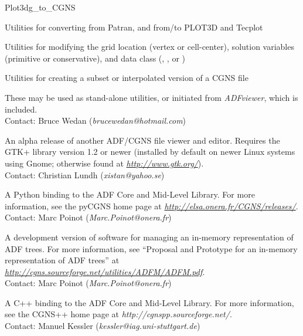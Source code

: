 \begin{Ventryi}{Plot3dg\_to\_CGNS}
\begin{itemize*}
      \item Utilities for converting from Patran, and from/to PLOT3D and
            Tecplot
      \item Utilities for modifying the grid location
            (vertex or cell-center), solution variables
            (primitive or conservative), and data class
            (, , or
            )
      \item Utilities for creating a subset or interpolated version of
            a CGNS file
      \end{itemize*}
      These may be used as stand-alone utilities, or initiated from
      \textit{ADFviewer}, which is included.\\
      Contact: Bruce Wedan (\textit{brucewedan@hotmail.com})
\item [CGNS Viewer]
      An alpha release of another ADF/CGNS file viewer and editor.
      Requires the GTK+ library version 1.2 or newer (installed by default
      on newer Linux systems using Gnome; otherwise found at
      {\itshape\url{http://www.gtk.org/}}).\\
      Contact: Christian Lundh (\textit{xistan@yahoo.se})
\item [PyCGNS]
      A Python binding to the ADF Core and Mid-Level Library.
      For more information, see the pyCGNS home page at
      {\itshape\url{http://elsa.onera.fr/CGNS/releases/}}.\\
      Contact: Marc Poinot (\textit{Marc.Poinot@onera.fr})
\item [ADFM]
      A development version of software for managing an in-memory
      representation of ADF trees.
      For more information, see ``Proposal and Prototype for an in-memory
      representation of ADF trees'' at
      {\itshape\url{http://cgns.sourceforge.net/utilities/ADFM/ADFM.pdf}}.\\
      Contact: Marc Poinot (\textit{Marc.Poinot@onera.fr})
\item [CGNS++]
      A C++ binding to the ADF Core and Mid-Level Library.
      For more information, see the CGNS++ home page at
      \textit{http://cgnspp.sourceforge.net/}.\\
      Contact: Manuel Kessler (\textit{kessler@iag.uni-stuttgart.de})
\end{Ventryi}
